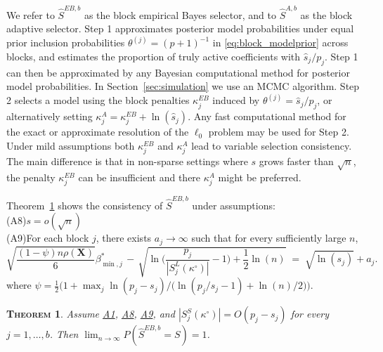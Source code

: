 \documentclass[bj,authoryear]{imsart}
\theoremstyle{plain}
\newtheorem{thm}{\textsc{Theorem}}[section]
\newcommand{\bs}{\boldsymbol}
\begin{document}
We refer to $\hat{S}^{EB,b}$ as the block empirical Bayes selector, and to $\hat{S}^{A,b}$ as the block adaptive selector.
Step 1 approximates posterior model probabilities under equal prior inclusion probabilities $\theta^{(j)}=(p+1)^{-1}$ in \eqref{eq:block_modelprior} across blocks, and estimates the proportion of truly active coefficients with $\hat{s}_j/p_j$. Step 1 can then be approximated by any Bayesian computational method for posterior model probabilities. In Section~\ref{sec:simulation} we use an MCMC algorithm. Step 2 selects a model using the block penalties $\kappa_j^{EB}$ induced by $\theta^{(j)}=\hat{s}_j/p_j$,
or alternatively setting $\kappa_j^{A}= \kappa_j^{EB} + \ln(\hat{s}_j)$. Any fast computational method for the exact or approximate resolution of the $\ell_0$ problem may be used for Step 2. 
Under mild assumptions both $\kappa_j^{EB}$ and $\kappa_j^{A}$ lead to variable selection consistency.
The main difference is that in non-sparse settings where $s$ grows faster than $\sqrt{n}$, the penalty $\kappa_j^{EB}$ can be insufficient and there $\kappa_j^{A}$ might be preferred.

Theorem~\ref{theo:empbayesselconsist} shows
the consistency of $\hat{S}^{EB,b}$ under
assumptions:\\[5pt]
\hypertarget{lab:A8}{(A8)}\quad $s=o(\sqrt{n})$\\[5pt]
\hypertarget{lab:A9}{(A9)}\quad For each block $j$, there exists $a_j\to \infty$ such that for every sufficiently large $n$, 
\begin{equation*}\label{cond:suffIIreg2}
        \sqrt{\frac{ (1-\psi)n\rho(\bs X)}{6}}{\beta_{\min,j}^*} \,- \,\sqrt{\ln\bigg(\frac{p_j}{|S^{L}_j(\kappa^{\circ})|}-1\bigg)+\frac12\ln(n)} \;=\; \sqrt{\ln(s_j)} + a_j .
    \end{equation*}
where $\psi=\tfrac12\Big(1+\max_j \ln(p_j-s_j)/\big(\ln(p_j/s_j-1)+\ln(n)/2\big)\Big)$.

\begin{thm}\label{theo:empbayesselconsist}
    Assume \hyperlink{lab:A1}{A1}, \hyperlink{lab:A8}{A8}, \hyperlink{lab:A9}{A9}, and $|S^{S}_j(\kappa^{\circ})|=O(p_j-s_j)$ for every $j=1,\ldots,b$. Then
$\lim_{n \to \infty} P(\hat{S}^{EB,b} = S)= 1$.
\end{thm}
\end{document}
